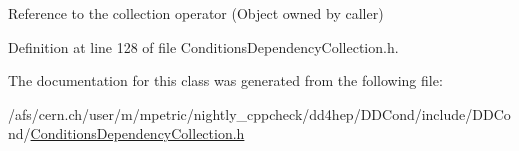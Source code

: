 Reference to the collection operator (Object owned by caller) 



Definition at line 128 of file Conditions\+Dependency\+Collection.\+h.



The documentation for this class was generated from the following file\+:\begin{DoxyCompactItemize}
\item 
/afs/cern.\+ch/user/m/mpetric/nightly\+\_\+cppcheck/dd4hep/\+D\+D\+Cond/include/\+D\+D\+Cond/\hyperlink{_conditions_dependency_collection_8h}{Conditions\+Dependency\+Collection.\+h}\end{DoxyCompactItemize}
